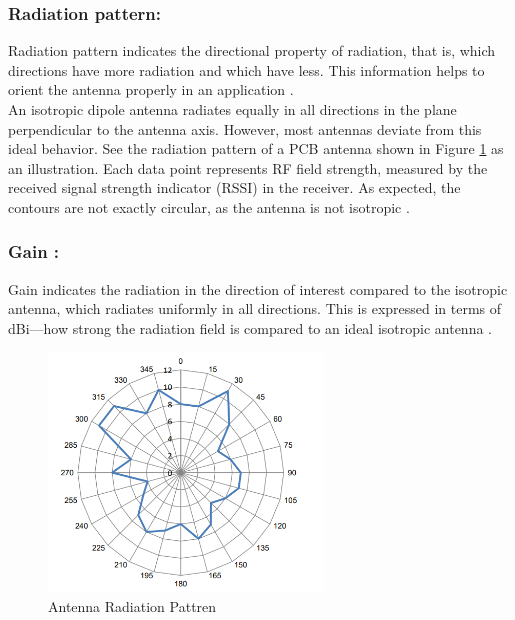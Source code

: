 \subsubsection{Radiation pattern:}
Radiation pattern indicates the directional property of radiation, that is, which directions have 
more radiation and which have less. This information helps to orient the antenna properly in an application \cite{AN91445}.\\


\indent An isotropic dipole antenna radiates equally in all directions in the plane perpendicular to the antenna axis. However, 
most antennas deviate from this ideal behavior. See the radiation pattern of a PCB antenna shown in Figure \ref{fig:ANTENNA_RADIATION_PATTERN} as an 
illustration. Each data point represents RF field strength, measured by the received signal strength indicator (RSSI) in 
the receiver. As expected, the contours are not exactly circular, as the antenna is not isotropic \cite{AN91445}.


\subsubsection{Gain :}
Gain indicates the radiation in the direction of interest compared to the isotropic antenna, which radiates 
uniformly in all directions. This is expressed in terms of dBi—how strong the radiation field is compared to an ideal 
isotropic antenna \cite{AN91445}.

\begin{figure}[ht]
	\centering
	\includegraphics[width=0.65\textwidth]{Chap03/Figures/Antenna_Radiation_Pattren.PNG}
	\caption{Antenna Radiation Pattren}
	\label{fig:ANTENNA_RADIATION_PATTERN}
\end{figure}

% 


